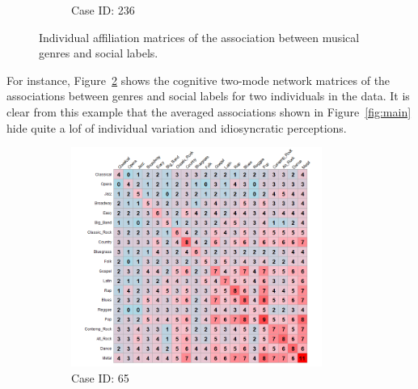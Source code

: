 \documentclass[12pt]{article}
\begin{document}
\begin{figure}[ht!]
\begin{subfigure}[b]{0.49\textwidth}
            \caption{Case ID: 236}
            \label{fig:ind-ex-aff2}
    \end{subfigure}
    \caption{Individual affiliation matrices of the association between musical genres and social labels.}
    \label{fig:ind-ex-aff}
\end{figure}

For instance, Figure~\ref{fig:ind-ex-aff} shows the cognitive two-mode network matrices of the associations between genres and social labels for two individuals in the data. It is clear from this example that the averaged associations shown in Figure~\ref{fig:main} hide quite a lof of individual variation and idiosyncratic perceptions. 

\begin{figure}[ht!]
    \captionsetup[subfigure]{font=footnotesize,labelfont=footnotesize}
    \centering
     \begin{subfigure}[b]{0.49\textwidth}
        \includegraphics[trim={1cm 0cm 0cm 0cm},clip, width=0.9\textwidth]{Plots/data-ex-rp1.png}
            \caption{Case ID: 65}
            \label{fig:ind-ex-rp1}
    \end{subfigure}
     \begin{subfigure}[b]{0.49\textwidth}

\end{subfigure}
\end{figure}
\end{document}
